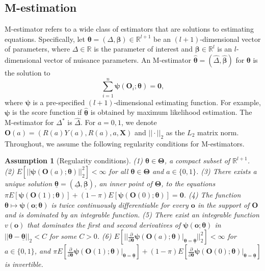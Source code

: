 \documentclass[12pt]{article}
\newtheorem{assumption}{Assumption}
\newcommand{\bX}{\boldsymbol{X}}\newcommand{\bO}{\boldsymbol{O}}
\newcommand{\bo}{\boldsymbol{o}}
\newcommand{\bzero}{\boldsymbol{0}}
\newcommand{\bbeta}{\boldsymbol{\beta}}
\newcommand{\btheta}{\boldsymbol{\theta}}
\newcommand{\bTheta}{\boldsymbol{\Theta}}
\newcommand{\bpsi}{\boldsymbol{\psi}}
\begin{document}
\subsection{M-estimation}
M-estimator \citep[Section 5]{vaart_1998} refers to a wide class of estimators that are solutions to estimating equations. Specifically, let $\btheta = (\Delta, \bbeta) \in \mathbb{R}^{l+1}$ be an $(l+1)$-dimensional vector of parameters, where $\Delta \in \mathbb{R}$ is the parameter of interest and  $\bbeta \in \mathbb{R}^l$ is an $l$-dimensional vector of nuisance parameters. An M-estimator $\widehat{\btheta} = (\widehat{\Delta}, \widehat{\bbeta})$ for $\btheta$ is the solution to $$\sum_{i=1}^n \bpsi(\bO_i;\btheta) = \bzero,$$
where $\bpsi$ is a pre-specified $(l+1)$-dimensional estimating function. For example, $\bpsi$ is the score function if $\widehat{\btheta}$ is obtained by maximum likelihood estimation. The M-estimator for $\Delta^*$ is $\widehat{\Delta}$. For $a= 0,1$, we denote $\bO(a) = (R(a)Y(a), R(a), a, \bX)$ and $||\cdot||_2$ as the $L_2$ matrix norm. Throughout, we assume the following regularity conditions for M-estimators.
\begin{assumption}[Regularity conditions]\label{assp3} (1) $\btheta \in \bTheta$, a compact subset of $\mathbb{R}^{l+1}$. \\
(2) $E[||\bpsi(\bO(a);\btheta)||_2^2] < \infty$ for all $\btheta \in \bTheta$ and $a \in \{0,1\}$.
(3) There exists a unique solution $\underline{\btheta} = (\underline{\Delta}, \underline{\bbeta})$, an inner point of $\bTheta$, to the equations $\pi E[\bpsi(\bO(1);\btheta)] + (1-\pi)E[\bpsi(\bO(0);\btheta)] = \bzero$.
(4) The function $\btheta \mapsto \bpsi(\bo;\btheta)$ is twice continuously differentiable for every $\bo$ in the support of $\bO$ and is dominated by an integrable function. 
(5) There exist an integrable function $v(\bo)$ that dominates the first and second derivatives of $\bpsi(\bo;\btheta)$ in  $||\btheta-\underline{\btheta}||_2 < C$ for some $C>0$. 
(6) $E\left[||\frac{\partial}{\partial \btheta} \bpsi(\bO(a);\btheta)\big|_{\btheta=\underline{\btheta}}||_2^2\right] < \infty$ for $a \in \{0,1\}$, and $\pi E\left[\frac{\partial}{\partial \btheta} \bpsi(\bO(1);\btheta)\big|_{\btheta=\underline{\btheta}}\right] + (1-\pi)E\left[\frac{\partial}{\partial \btheta} \bpsi(\bO(0);\btheta)\big|_{\btheta=\underline{\btheta}}\right]$ is invertible.
\end{assumption}
\end{document}
